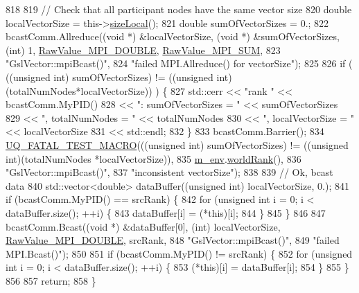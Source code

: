 \begin{DoxyCode}
818 
819   \textcolor{comment}{// Check that all participant nodes have the same vector size}
820   \textcolor{keywordtype}{double} localVectorSize  = this->\hyperlink{class_q_u_e_s_o_1_1_gsl_vector_ace6fb1739b7cf6456b3dcde84c766fb3}{sizeLocal}();
821   \textcolor{keywordtype}{double} sumOfVectorSizes = 0.; 
822   bcastComm.Allreduce((\textcolor{keywordtype}{void} *) &localVectorSize, (\textcolor{keywordtype}{void} *) &sumOfVectorSizes, (\textcolor{keywordtype}{int}) 1, 
      \hyperlink{_mpi_comm_8h_ad0f503bd9fecfe4e570ca3d15aaf2518}{RawValue\_MPI\_DOUBLE}, \hyperlink{_mpi_comm_8h_afbf78d291c032aa7f512bc566cee2bd1}{RawValue\_MPI\_SUM},
823                       \textcolor{stringliteral}{"GslVector::mpiBcast()"},
824                       \textcolor{stringliteral}{"failed MPI.Allreduce() for vectorSize"});
825 
826   \textcolor{keywordflow}{if} ( ((\textcolor{keywordtype}{unsigned} \textcolor{keywordtype}{int}) sumOfVectorSizes) != ((\textcolor{keywordtype}{unsigned} \textcolor{keywordtype}{int})(totalNumNodes*localVectorSize)) ) \{
827     std::cerr << \textcolor{stringliteral}{"rank "}                 << bcastComm.MyPID()
828               << \textcolor{stringliteral}{": sumOfVectorSizes = "} << sumOfVectorSizes
829               << \textcolor{stringliteral}{", totalNumNodes = "}    << totalNumNodes
830               << \textcolor{stringliteral}{", localVectorSize = "}  << localVectorSize
831               << std::endl;
832   \}
833   bcastComm.Barrier();
834   \hyperlink{_defines_8h_a56d63d18d0a6d45757de47fcc06f574d}{UQ\_FATAL\_TEST\_MACRO}(((\textcolor{keywordtype}{unsigned} \textcolor{keywordtype}{int}) sumOfVectorSizes) != ((\textcolor{keywordtype}{unsigned} \textcolor{keywordtype}{int})(totalNumNodes
      *localVectorSize)),
835                       \hyperlink{class_q_u_e_s_o_1_1_vector_ae7615172bb1e54339151d3f3d71a0344}{m\_env}.\hyperlink{class_q_u_e_s_o_1_1_base_environment_a78b57112bbd0e6dd0e8afec00b40ffa7}{worldRank}(),
836                       \textcolor{stringliteral}{"GslVector::mpiBcast()"},
837                       \textcolor{stringliteral}{"inconsistent vectorSize"});
838 
839   \textcolor{comment}{// Ok, bcast data}
840   std::vector<double> dataBuffer((\textcolor{keywordtype}{unsigned} \textcolor{keywordtype}{int}) localVectorSize, 0.);
841   \textcolor{keywordflow}{if} (bcastComm.MyPID() == srcRank) \{
842     \textcolor{keywordflow}{for} (\textcolor{keywordtype}{unsigned} \textcolor{keywordtype}{int} i = 0; i < dataBuffer.size(); ++i) \{
843       dataBuffer[i] = (*this)[i];
844     \}
845   \}
846 
847   bcastComm.Bcast((\textcolor{keywordtype}{void} *) &dataBuffer[0], (\textcolor{keywordtype}{int}) localVectorSize, 
      \hyperlink{_mpi_comm_8h_ad0f503bd9fecfe4e570ca3d15aaf2518}{RawValue\_MPI\_DOUBLE}, srcRank,
848                   \textcolor{stringliteral}{"GslVector::mpiBcast()"},
849                   \textcolor{stringliteral}{"failed MPI.Bcast()"});
850 
851   \textcolor{keywordflow}{if} (bcastComm.MyPID() != srcRank) \{
852     \textcolor{keywordflow}{for} (\textcolor{keywordtype}{unsigned} \textcolor{keywordtype}{int} i = 0; i < dataBuffer.size(); ++i) \{
853       (*this)[i] = dataBuffer[i];
854     \}
855   \}
856 
857   \textcolor{keywordflow}{return};
858 \}
\end{DoxyCode}
